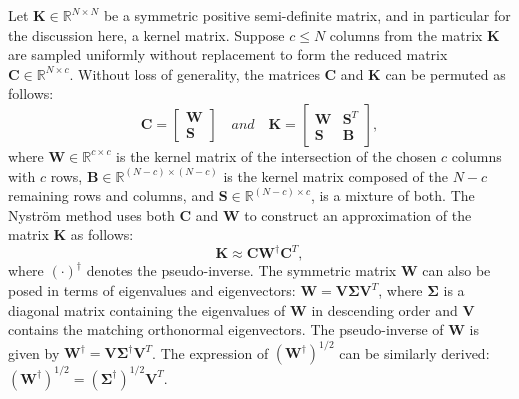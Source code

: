 \documentclass[journal]{IEEEtran}
\newcommand{\bK}{\mathbf{K}}
\newcommand{\bC}{\mathbf{C}}
\newcommand{\bW}{\mathbf{W}}
\newcommand{\bS}{\mathbf{S}}
\newcommand{\bB}{\mathbf{B}}
\newcommand{\bV}{\mathbf{V}}
\begin{document}
Let $\bK \in \mathbb{R}^{N \times N}$ be a symmetric positive semi-definite matrix, and in particular for the discussion here, a kernel matrix. Suppose $c \leq N$ columns from the matrix $\bK$ are sampled uniformly without replacement to form the reduced matrix $\bC \in \mathbb{R}^{N \times c}$. Without loss of generality, the matrices $\bC$ and $\bK$ can be permuted as follows:
\begin{equation}\label{eq:NystromMatrixDecomp}
    \bC =
    \begin{bmatrix}
    \bW \\
    \bS
    \end{bmatrix}
    \quad and \quad
    \bK =
    \begin{bmatrix}
    \bW & \bS^T \\
    \bS & \bB
    \end{bmatrix},
\end{equation}
where $\bW \in \mathbb{R}^{c \times c}$ is the kernel matrix of the intersection of the chosen $c$ columns with $c$ rows, $\bB \in \mathbb{R}^{(N-c)\times (N-c)}$ is the kernel matrix composed of the $N-c$ remaining rows and columns, and $\bS \in \mathbb{R}^{(N-c) \times c}$, is a mixture of both.
The Nystr\"{o}m method uses both $\bC$ and $\bW$ to construct an approximation of the matrix $\bK$ as follows:
\begin{equation}\label{eq:Nystrom}
\bK \approx \bC \bW^{\dagger} \bC^T,
\end{equation}
where $(\cdot)^{\dagger}$ denotes the pseudo-inverse. The symmetric matrix $\bW$ can also be posed in terms of eigenvalues and eigenvectors: $\bW=\bV \boldsymbol{\Sigma} \bV^T$, where $\boldsymbol{\Sigma}$ is a diagonal matrix containing the eigenvalues of $\bW$ in descending order and $\bV$ contains the matching orthonormal eigenvectors. The pseudo-inverse of $\bW$ is given by $\bW^{\dagger}=\bV \boldsymbol{\Sigma}^{\dagger} \bV^T$. The expression of $(\bW^{\dagger})^{1/2}$ can be similarly derived: $(\bW^{\dagger})^{1/2}=(\boldsymbol{\Sigma}^{\dagger})^{1/2}\bV^T$.
\end{document}
